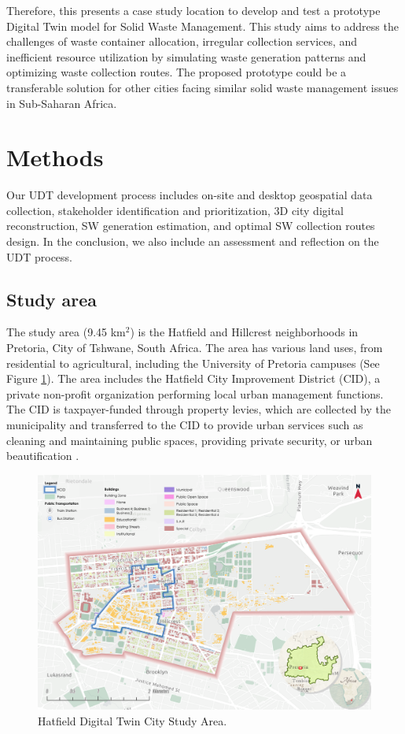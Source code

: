 \documentclass[authoryear,preprint,review,doubleblind, 12pt]{elsarticle}
\begin{document}
Therefore, this presents a case study location to develop and test a prototype Digital Twin model for Solid Waste Management. This study aims to address the challenges of waste container allocation, irregular collection services, and inefficient resource utilization by simulating waste generation patterns and optimizing waste collection routes. The proposed prototype could be a transferable solution for other cities facing similar solid waste management issues in Sub-Saharan Africa.
    
    \section{Methods} \label{sec:Methods}
    Our UDT development process includes on-site and desktop geospatial data collection, stakeholder identification and prioritization, 3D city digital reconstruction, SW generation estimation, and optimal SW collection routes design. In the conclusion, we also include an assessment and reflection on the UDT process.
    \subsection{Study area} \label{subsec:Study Area}
    The study area (9.45 km$^2$) is the Hatfield and Hillcrest neighborhoods in Pretoria, City of Tshwane, South Africa. The area has various land uses, from residential to agricultural, including the University of Pretoria campuses (See Figure \ref{fig:studyArea}). The area includes the Hatfield City Improvement District (CID), a private non-profit organization performing local urban management functions. The CID is taxpayer-funded through property levies, which are collected by the municipality and transferred to the  CID to provide urban services such as cleaning and maintaining public spaces, providing private security, or urban beautification \citep{cidHatfieldCIDBrochure2021}.
    \begin{figure}[h!]
        \centering
        \includegraphics[width=\linewidth]{Figures/Study Area+HICD.png}
        \caption{Hatfield Digital Twin City Study Area.}
        \label{fig:studyArea}
    \end{figure}
\end{document}
